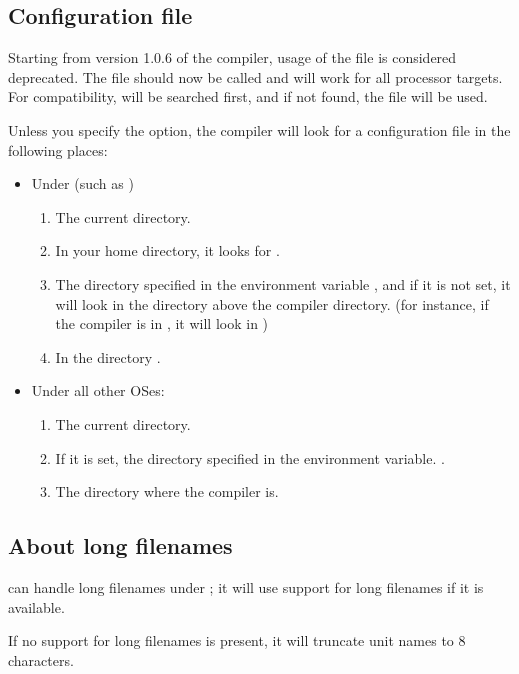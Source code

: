 \subsection{Configuration file}
\label{searchconfig}

Starting from version 1.0.6 of the compiler, usage of the
file  is considered deprecated. The file
should now be called  and will work for
all processor targets. For compatibility,  will
be searched first, and if not found, the file 
will be used.

Unless you specify the  option, the compiler will look
for a configuration file  in the following places:

\begin{itemize}
\item Under \unix (such as \linux)
\begin{enumerate}
\item The current directory.
\item In your home directory, it looks for .
\item The directory specified in the environment variable
, and if it is not set, it will look in the 
 directory above the compiler directory. (for instance, if the
compiler is in , it will look in )
\item In the directory .
\end{enumerate}
\item Under all other OSes:
\begin{enumerate}
\item The current directory.
\item If it is set, the directory specified in the environment variable.
.
\item The directory where the compiler is.
\end{enumerate}
\end{itemize}

\subsection{About long filenames}
\fpc can handle long filenames under \windows; it will use support for
long filenames if it is available.

If no support for long filenames is present, it will truncate unit names
to 8 characters.

